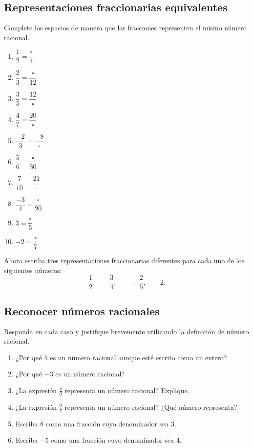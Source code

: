 \subsection*{Representaciones fraccionarias equivalentes}

Complete los espacios de manera que las fracciones representen el mismo número racional.

\begin{enumerate}
\item \(\dfrac12=\dfrac{\square}{4}\)
\item \(\dfrac23=\dfrac{\square}{12}\)
\item \(\dfrac35=\dfrac{12}{\square}\)
\item \(\dfrac47=\dfrac{20}{\square}\)
\item \(\dfrac{-2}{3}=\dfrac{-8}{\square}\)
\item \(\dfrac56=\dfrac{\square}{30}\)
\item \(\dfrac{7}{10}=\dfrac{21}{\square}\)
\item \(\dfrac{-3}{4}=\dfrac{\square}{20}\)
\item \(3=\dfrac{\square}{5}\)
\item \(-2=\dfrac{\square}{7}\)
\end{enumerate}

Ahora escriba tres representaciones fraccionarias diferentes para cada uno de los siguientes números:
\[
\frac12,\qquad \frac34,\qquad -\frac25,\qquad 2.
\]

\subsection*{Reconocer números racionales}

Responda en cada caso y justifique brevemente utilizando la definición de número racional.

\begin{enumerate}
\item ¿Por qué \(5\) es un número racional aunque esté escrito como un entero?
\item ¿Por qué \(-3\) es un número racional?
\item ¿La expresión \(\frac{4}{0}\) representa un número racional? Explique.
\item ¿La expresión \(\frac{0}{7}\) representa un número racional? ¿Qué número representa?
\item Escriba \(8\) como una fracción cuyo denominador sea \(3\).
\item Escriba \(-5\) como una fracción cuyo denominador sea \(4\).
\end{enumerate}

